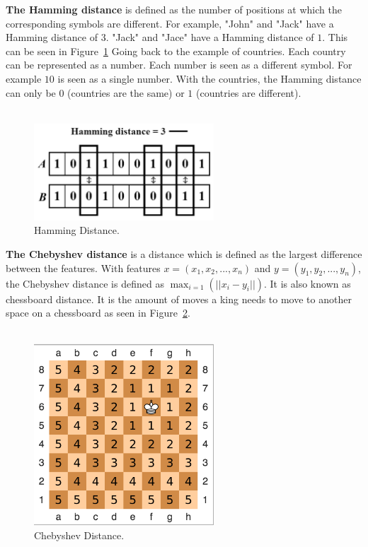 \noindent \textbf{The Hamming distance} is defined as the number of positions at which the corresponding symbols are different.\cite{hammingDistance} For example, "John" and "Jack" have a Hamming distance of $3$. "Jack" and "Jace" have a Hamming distance of $1$. This can be seen in Figure~\ref{fig:hammingDistance} Going back to the example of countries. Each country can be represented as a number. Each number is seen as a different symbol. For example $10$ is seen as a single number. With the countries, the Hamming distance can only be $0$ (countries are the same) or $1$ (countries are different). \\\\

\begin{figure}[H]
\centering
\includegraphics[width=0.6\textwidth]{Figures/hammingDistance}
\decoRule
\caption[Hamming Distance]{Hamming Distance. \cite{hammingDistance}}
\label{fig:hammingDistance}
\end{figure}

\noindent \textbf{The Chebyshev distance} is a distance which is defined as the largest difference between the features. With features $x = (x_1, x_2,..., x_n)$ and $y = (y_1, y_2,..., y_n)$, the Chebyshev distance is defined as $\max_{i=1}(||x_i-y_i||)$. It is also known as chessboard distance. \cite{chebyshevDistanceExplain} It is the amount of moves a king needs to move to another space on a chessboard as seen in Figure~\ref{fig:chebyshevDistance}.  \\\\

\begin{figure}[H]
\centering
\includegraphics[width=0.6\textwidth]{Figures/chebyshevDistance}
\decoRule
\caption[Chebyshev Distance]{Chebyshev Distance. \cite{chebyshevDistance}}
\label{fig:chebyshevDistance}
\end{figure}

